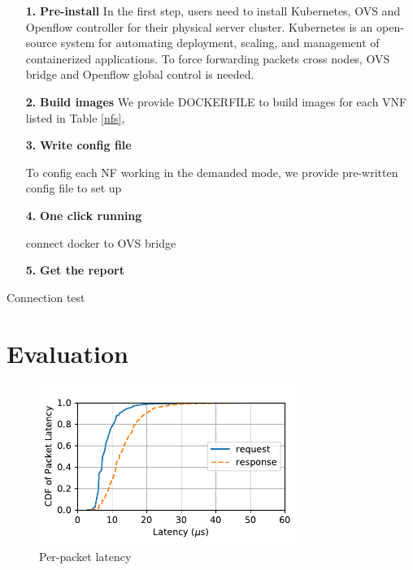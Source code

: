 \documentclass{sig-alternate-10pt}
\begin{document}
\begin{itemize}
\item[\textbf{1.}]{}\textbf{Pre-install} 
In the first step, users need to install Kubernetes, OVS 
and Openflow controller for their physical server cluster. 
Kubernetes is an open-source system for automating deployment, scaling, 
and management of containerized applications. 
To force forwarding packets cross nodes, 
OVS bridge and Openflow global control is needed. 

\item[\textbf{2.}]{}\textbf{Build images} 
We provide DOCKERFILE to build images for each VNF listed in Table \ref{nfs}, 



\item[\textbf{3.}]{}\textbf{Write config file} 

To config each NF working in the demanded mode, 
we provide pre-written config file to set up 

\item[\textbf{4.}]{}\textbf{One click running} 

connect docker to OVS bridge

\item[\textbf{5.}]{}\textbf{Get the report} 
\end{itemize}




Connection test 





\section{Evaluation}

\begin{figure}[t]
\label{cdf}
\centering
\includegraphics[width=3.3in]{cdf_chain1.pdf}
\caption{Per-packet latency}
\end{figure}
\end{document}
